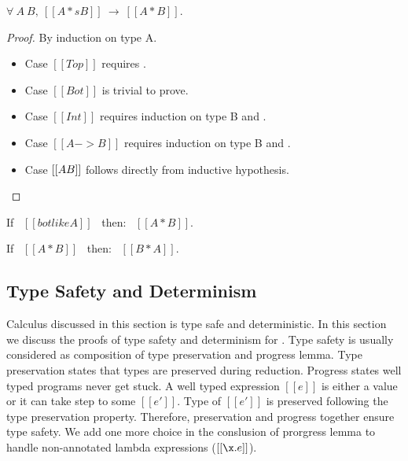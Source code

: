 \begin{lemma}
\label{lemma:union:disj-complete}
$\forall ~ A ~ B, ~[[A *s B]] ~ \rightarrow ~ [[A * B]]$.
\end{lemma}

\begin{proof}
  By induction on type A.
  \begin{itemize}
    \item Case $[[Top]]$ requires .
    \item Case $[[Bot]]$ is trivial to prove.
    \item Case $[[Int]]$ requires induction on type B and
          .
    \item Case $[[A -> B]]$ requires induction on type B and .
    \item Case $[[A \/ B]]$ follows directly from inductive hypothesis.
  \end{itemize}
\end{proof}

\begin{lemma}
\label{lemma:union:bl-disj}
  If \ $[[botlike A]]$ \ then: \ $[[A * B]]$.
\end{lemma}

\begin{lemma}
\label{lemma:union:disj-sym}
  If \ $[[A * B]]$ \ then: \ $[[B * A]]$.
\end{lemma}

\subsection{Type Safety and Determinism}
\label{sec:union:safety}
Calculus discussed in this section is type safe and deterministic. In this section we discuss the
proofs of type safety and determinism for \cal. Type safety is usually considered as composition
of type preservation and progress lemma. Type preservation states that types are preserved during
reduction. Progress states well typed programs never get stuck. A well typed expression $[[e]]$ is 
either a value or it can take step to some $[[e']]$. Type of $[[e']]$ is preserved following the
type preservation property. Therefore, preservation and progress together ensure type safety.
We add one more choice in the conslusion of prorgress lemma to handle non-annotated lambda expressions 
($[[\x.e]]$).

